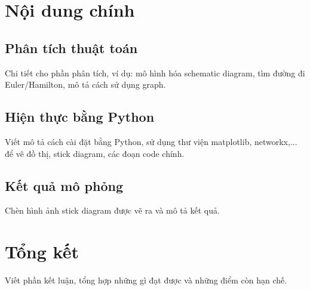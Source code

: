 \documentclass[a4paper,12pt]{article}
\begin{document}
\section{Nội dung chính}

\subsection{Phân tích thuật toán}
Chi tiết cho phần phân tích, ví dụ: mô hình hóa schematic diagram, tìm đường đi Euler/Hamilton, mô tả cách sử dụng graph.

\subsection{Hiện thực bằng Python}
Viết mô tả cách cài đặt bằng Python, sử dụng thư viện matplotlib, networkx,... để vẽ đồ thị, stick diagram, các đoạn code chính.

\subsection{Kết quả mô phỏng}
Chèn hình ảnh stick diagram được vẽ ra và mô tả kết quả.

\section{Tổng kết}
Viết phần kết luận, tổng hợp những gì đạt được và những điểm còn hạn chế.
\end{document}
